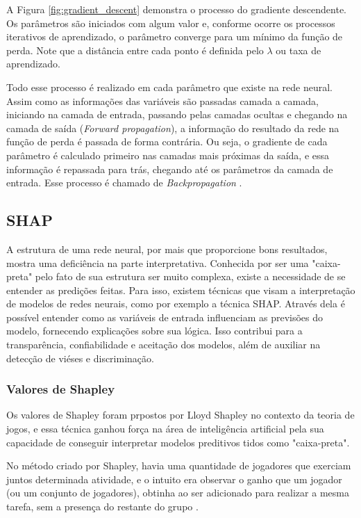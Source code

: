 A Figura \ref{fig:gradient_descent} demonstra o processo do gradiente descendente. Os parâmetros são iniciados
 com algum valor e, conforme ocorre os processos iterativos de aprendizado, o parâmetro converge para um mínimo
  da função de perda. Note que a distância entre cada ponto é definida pelo $\lambda$ ou taxa de aprendizado.


Todo esse processo é realizado em cada parâmetro que existe na rede neural. Assim como as informações das variáveis
 são passadas camada a camada, iniciando na camada de entrada, passando pelas camadas ocultas e chegando na camada de 
 saída (\textit{Forward propagation}), a informação do resultado da rede na função de perda 
 é passada de forma contrária. Ou seja, o gradiente de cada parâmetro é calculado primeiro nas camadas mais próximas da saída,
  e essa informação é repassada para trás, chegando até os parâmetros da camada de entrada. Esse processo
   é chamado de \textit{Backpropagation} \cite{werbos1974beyond}.


\subsection{SHAP}

A estrutura de uma rede neural, por mais que proporcione bons resultados, mostra uma deficiência na parte interpretativa. 
Conhecida por ser uma "caixa-preta" pelo fato de sua estrutura ser muito complexa, existe a necessidade de se entender 
as predições feitas.
Para isso, existem técnicas que visam a interpretação de modelos de redes neurais, como por exemplo a
 técnica SHAP. Através dela é possível entender como as variáveis de entrada influenciam as previsões do modelo, 
 fornecendo explicações sobre sua lógica. Isso contribui para a 
 transparência, confiabilidade e aceitação dos modelos, além de auxiliar na detecção de viéses e discriminação. 

\subsubsection{Valores de Shapley}

Os valores de Shapley foram prpostos por Lloyd Shapley \cite{shapley1953value} no contexto da teoria de jogos, 
e essa técnica ganhou   força na área de inteligência artificial pela sua capacidade de conseguir interpretar modelos
 preditivos tidos como "caixa-preta". 
 
 No método criado por Shapley, havia uma quantidade de jogadores que exerciam
  juntos determinada atividade, e o intuito era observar o ganho que um jogador (ou um conjunto de jogadores), obtinha 
  ao ser adicionado para realizar a mesma tarefa, sem a presença do restante do grupo \cite{hart_1989}. 

